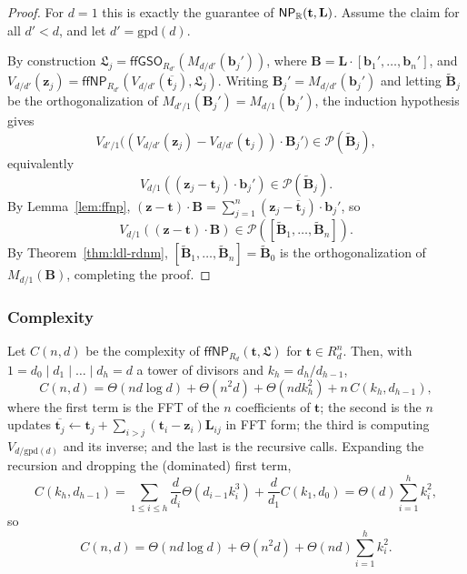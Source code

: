 \begin{proof}
	For $d = 1$ this is exactly the guarantee of $\mathsf{NP}_{\mathbb{R}}(\mathbf{t}, \mathbf{L})$. Assume the claim for all $d' < d$, and let $d' = \mathrm{gpd}(d)$.

	By construction $\mathfrak{L}_j = \mathsf{ffGSO}_{R_{d'}}(M_{d/d'}(\mathbf{b}_j'))$, where $\mathbf{B} = \mathbf{L} \cdot [\mathbf{b}_1', \dots, \mathbf{b}_n']$, and $V_{d/d'}(\mathbf{z}_j) = \mathsf{ffNP}_{R_{d'}}(V_{d/d'}(\overline{\mathbf{t}_j}), \mathfrak{L}_j)$. Writing $\mathbf{B}_j' = M_{d/d'}(\mathbf{b}_j')$ and letting $\tilde{\mathbf{B}}_j$ be the orthogonalization of $M_{d'/1}(\mathbf{B}_j') = M_{d/1}(\mathbf{b}_j')$, the induction hypothesis gives
	\[
		V_{d'/1}\big( (V_{d/d'}(\mathbf{z}_j) - V_{d/d'}(\mathbf{t}_j)) \cdot \mathbf{B}_j' \big) \in \mathcal{P}(\tilde{\mathbf{B}}_j),
	\]
	equivalently
	\[
		V_{d/1}((\mathbf{z}_j - \mathbf{t}_j) \cdot \mathbf{b}_j') \in \mathcal{P}(\tilde{\mathbf{B}}_j).
	\]
	By Lemma~\ref{lem:ffnp}, $(\mathbf{z} - \mathbf{t}) \cdot \mathbf{B} = \sum_{j=1}^n (\mathbf{z}_j - \overline{\mathbf{t}}_j) \cdot \mathbf{b}_j'$, so
	\[
		V_{d/1}((\mathbf{z} - \mathbf{t}) \cdot \mathbf{B}) \in \mathcal{P}([\tilde{\mathbf{B}}_1, \dots, \tilde{\mathbf{B}}_n]).
	\]
	By Theorem~\ref{thm:ldl-rdnm}, $[\tilde{\mathbf{B}}_1, \dots, \tilde{\mathbf{B}}_n] = \tilde{\mathbf{B}}_0$ is the orthogonalization of $M_{d/1}(\mathbf{B})$, completing the proof.

\end{proof}

\subsubsection{Complexity}

Let $C(n,d)$ be the complexity of $\mathsf{ffNP}_{R_d}(\mathbf{t}, \mathfrak{L})$ for $\mathbf{t} \in R_d^n$. Then, with $1 = d_0 \mid d_1 \mid \dots \mid d_h = d$ a tower of divisors and $k_h = d_h/d_{h-1}$,
\[
	C(n,d) = \Theta(nd \log d) + \Theta(n^2 d) + \Theta(nd k_h^2) + n \, C(k_h, d_{h-1}),
\]
where the first term is the FFT of the $n$ coefficients of $\mathbf{t}$; the second is the $n$ updates $\overline{\mathbf{t}_j} \gets \mathbf{t}_j + \sum_{i>j}(\mathbf{t}_i - \mathbf{z}_i)\mathbf{L}_{ij}$ in FFT form; the third is computing $V_{d/\mathrm{gpd}(d)}$ and its inverse; and the last is the recursive calls. Expanding the recursion and dropping the (dominated) first term,
\[
	C(k_h, d_{h-1}) = \sum_{1 \leq i \leq h} \frac{d}{d_i} \Theta(d_{i-1} k_i^3) + \frac{d}{d_1} C(k_1, d_0) = \Theta(d) \sum_{i=1}^h k_i^2,
\]
so
\[
	C(n,d) = \Theta(nd \log d) + \Theta(n^2 d) + \Theta(nd) \sum_{i=1}^h k_i^2.
\]


